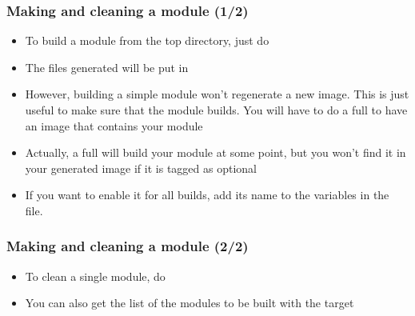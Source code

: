\begin{frame}
  \frametitle{Making and cleaning a module (1/2)}
  \begin{itemize}
  \item To build a module from the top directory, just do
  \item The files generated will be put in
  \item However, building a simple module won't regenerate a new image.
    This is just useful to make sure that the module builds.
    You will have to do a full  to have an image that contains
    your module
  \item Actually, a full  will build your module at some
    point, but you won't find it in your generated image if it is
    tagged as optional
  \item If you want to enable it for all builds, add its name to the
     variables in the
     file.
  \end{itemize}
\end{frame}

\begin{frame}
  \frametitle{Making and cleaning a module (2/2)}
  \begin{itemize}
  \item To clean a single module, do 
  \item You can also get the list of the modules to be built with the
     target
  \end{itemize}
\end{frame}
